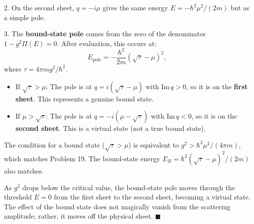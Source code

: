 \documentclass[12pt]{article}
\begin{document}
2. On the second sheet, $q = -i\mu$ gives the same energy $E = -\hbar^2\mu^2/(2m)$ but as a simple pole.

3. The \textbf{bound-state pole} comes from the zero of the denominator $1-g^2\Pi(E) = 0$. After evaluation, this occurs at:
\[
E_{\text{pole}} = -\frac{\hbar^2}{2m}(\sqrt{\tau}-\mu)^2,
\]
where $\tau = 4\pi mg^2/\hbar^2$.

\begin{itemize}
\item If $\sqrt{\tau}>\mu$: The pole is at $q = i(\sqrt{\tau}-\mu)$ with $\text{Im}\,q > 0$, so it is on the \textbf{first sheet}. This represents a genuine bound state.
\item If $\mu>\sqrt{\tau}$: The pole is at $q = -i(\mu-\sqrt{\tau})$ with $\text{Im}\,q < 0$, so it is on the \textbf{second sheet}. This is a virtual state (not a true bound state).
\end{itemize}

The condition for a bound state ($\sqrt{\tau}>\mu$) is equivalent to $g^2 > \hbar^2\mu^2/(4\pi m)$, which matches Problem 19. The bound-state energy $E_B = \hbar^2(\sqrt{\tau}-\mu)^2/(2m)$ also matches.

As $g^2$ drops below the critical value, the bound-state pole moves through the threshold $E=0$ from the first sheet to the second sheet, becoming a virtual state. The effect of the bound state does not magically vanish from the scattering amplitude; rather, it moves off the physical sheet. $\blacksquare$
\end{document}

